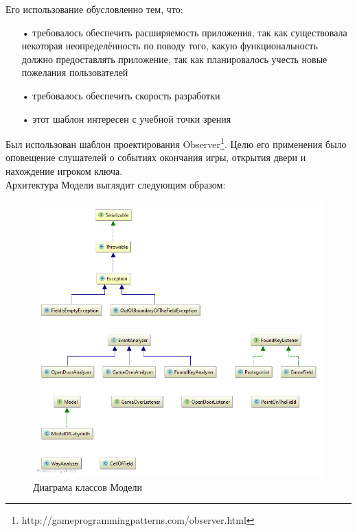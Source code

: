 Его использование обусловленно тем, что:

\begin{enumerate}  
\item[•]  требовалось обеспечить расширяемость приложения, так как существовала некоторая неопределённость по поводу того, какую функциональность должно предоставлять приложение, так как планировалось учесть новые пожелания пользователей
\item[•]  требовалось обеспечить скорость разработки
\item[•]  этот шаблон интересен с учебной точки зрения
\end{enumerate}

Был использован шаблон проектирования Observer\footnote{http://gameprogrammingpatterns.com/observer.html}. Целю его применения было оповещение слушателей о событиях окончания игры, открытия двери и нахождение игроком ключа.\\

Архитектура Модели выглядит следующим образом:
\begin{figure}[H]
	\begin{center}
		\includegraphics[scale=0.7]{pics/diagram.png}
		\caption{Диаграма классов Модели} 
		\label{pic:pic_name} %
	\end{center}
\end{figure}

